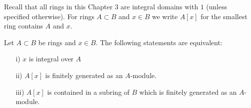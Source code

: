 \documentclass[NumTh.tex]{subfiles}
\begin{document}
Recall that all rings in this Chapter 3 are integral domains with $1$ (unless specified otherwise).
For rings $A \subset B$ and $x \in B$ we write $A[x]$ for the smallest ring contains $A$ and $x$.

\begin{theorem}\label{th_3_3_2}
  Let $A \subset B$ be rings and $x \in B$.
  The following statements are equivalent:
  \begin{enumerate}
    \item[i)] $x$ is integral over $A$
    \item[ii)] $A[x]$ is finitely generated as an $A$-module.
    \item[iii)] $A[x]$ is contained in a subring of $B$ which is finitely generated as an $A$-module.
  \end{enumerate}
\end{theorem}
\end{document}
